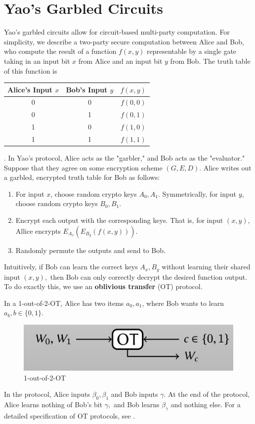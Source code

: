 \section{Yao's Garbled Circuits}
Yao's garbled circuits allow for circuit-based multi-party computation. 
For simplicity, we describe a two-party secure computation between Alice and Bob, who compute the result of a function $f(x,y)$ representable by a single gate taking in an input bit $x$ from Alice and an input bit $y$ from Bob. 
The truth table of this function is
\begin{center}
    \begin{tabular}{c|c|c}
         Alice's Input $x$ & Bob's Input $y$ & $f(x,y)$\\
         \hline
         0& 0 & $f(0,0)$ \\ 
         0& 1 & $f(0,1)$ \\ 
         1& 0 & $f(1,0)$ \\
         1& 1 & $f(1,1)$
    \end{tabular}
\end{center}.
In Yao's protocol, Alice acts as the "garbler," and Bob acts as the "evaluator."
Suppose that they agree on some encryption scheme $(G,E,D)$.
Alice writes out a garbled, encrypted truth table for Bob as follows:
\begin{mdframed}[innertopmargin=5pt, skipabove=\topskip, skipbelow=\topskip,align=left,nobreak=true]
\begin{enumerate}
    \item For input $x$, choose random crypto keys $A_0,A_1$. Symmetrically, for input $y,$ choose random crypto keys $B_0,B_1.$
    \item Encrypt each output with the corresponding keys. That is, for input $(x,y)$, Allice encrypts $E_{A_x}(E_{B_y}(f(x,y))).$
    \item Randomly permute the outputs and send to Bob.  
\end{enumerate}
\end{mdframed}
\newpage
Intuitively, if Bob can learn the correct keys $A_x,B_y$ without learning their shared input $(x,y),$ then Bob can only correctly decrypt the desired function output.
To do exactly this, we use an \textbf{oblivious transfer} (OT) protocol. 

In a 1-out-of-2-OT, Alice has two items $a_0, a_1$, where Bob wants to learn $a_b, b \in \{0,1\}.$

\begin{figure}
    \centering
    \includegraphics[scale=0.5]{OT.png}
    \caption{1-out-of-2-OT \cite{Rosulek_2018}}
    \label{fig:ot}
\end{figure}
In the protocol, Alice inputs $\beta_0, \beta_1$ and Bob inputs $\gamma$. At the end of the protocol, Alice learns nothing of Bob's bit $\gamma,$ and Bob learns $\beta_\gamma$ and nothing else.
For a detailed specification of OT protocols, see \cite{Goyal}.

